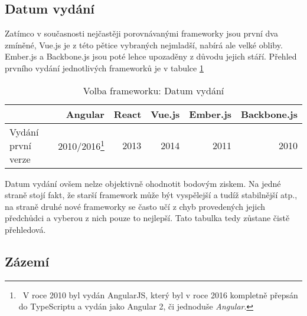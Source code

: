 
\subsection{Datum vydání}

Zatímco v současnosti nejčastěji porovnávanými frameworky jsou první dva zmíněné, Vue.js je z této pětice vybraných nejmladší, nabírá ale velké obliby. Ember.js a Backbone.js jsou poté lehce upozaděny z důvodu jejich stáří. Přehled prvního vydání jednotlivých frameworků je v tabulce \ref{table:compare:release}

\begin{table}[h]
\caption{Volba frameworku: Datum vydání}
\label{table:compare:release}
\begin{tabular}{lrrrrr}
\hline
                                         & Angular                     & React                     & Vue.js                     & Ember.js                     & Backbone.js               \\ \hline
Vydání první verze                       & 2010/2016\footnote{\ V roce 2010 byl vydán AngularJS, který byl v roce 2016 kompletně přepsán do TypeScriptu a vydán jako Angular 2, či jednoduše \emph{Angular}.}                                                                       & 2013                      & 2014                       & 2011                         & 2010                      \\
\end{tabular}
\end{table}

Datum vydání ovšem nelze objektivně ohodnotit bodovým ziskem. Na jedné straně stojí fakt, že starší framework může být vyspělejší a tudíž stabilnější atp., na straně druhé nové frameworky se často učí z chyb provedených jejich předchůdci a vyberou z nich pouze to nejlepší. Tato tabulka tedy zůstane čistě přehledová.


\subsection{Zázemí}

